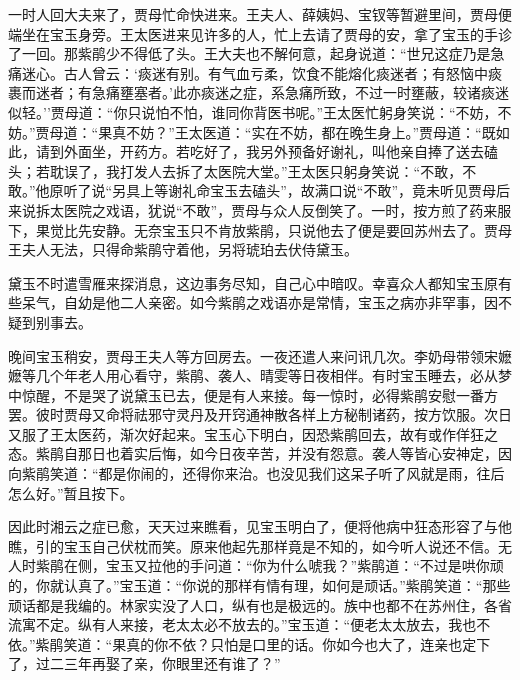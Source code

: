一时人回大夫来了，贾母忙命快进来。王夫人、薛姨妈、宝钗等暂避里间，贾母便端坐在宝玉身旁。王太医进来见许多的人，忙上去请了贾母的安，拿了宝玉的手诊了一回。那紫鹃少不得低了头。王大夫也不解何意，起身说道：``世兄这症乃是急痛迷心。古人曾云：`痰迷有别。有气血亏柔，饮食不能熔化痰迷者；有怒恼中痰裹而迷者；有急痛壅塞者。'此亦痰迷之症，系急痛所致，不过一时壅蔽，较诸痰迷似轻。''贾母道：``你只说怕不怕，谁同你背医书呢。''王太医忙躬身笑说：``不妨，不妨。''贾母道：``果真不妨？''王太医道：``实在不妨，都在晚生身上。''贾母道：``既如此，请到外面坐，开药方。若吃好了，我另外预备好谢礼，叫他亲自捧了送去磕头；若耽误了，我打发人去拆了太医院大堂。''王太医只躬身笑说：``不敢，不敢。''他原听了说``另具上等谢礼命宝玉去磕头''，故满口说``不敢''，竟未听见贾母后来说拆太医院之戏语，犹说``不敢''，贾母与众人反倒笑了。一时，按方煎了药来服下，果觉比先安静。无奈宝玉只不肯放紫鹃，只说他去了便是要回苏州去了。贾母王夫人无法，只得命紫鹃守着他，另将琥珀去伏侍黛玉。

黛玉不时遣雪雁来探消息，这边事务尽知，自己心中暗叹。幸喜众人都知宝玉原有些呆气，自幼是他二人亲密。如今紫鹃之戏语亦是常情，宝玉之病亦非罕事，因不疑到别事去。

晚间宝玉稍安，贾母王夫人等方回房去。一夜还遣人来问讯几次。李奶母带领宋嬷嬷等几个年老人用心看守，紫鹃、袭人、晴雯等日夜相伴。有时宝玉睡去，必从梦中惊醒，不是哭了说黛玉已去，便是有人来接。每一惊时，必得紫鹃安慰一番方罢。彼时贾母又命将祛邪守灵丹及开窍通神散各样上方秘制诸药，按方饮服。次日又服了王太医药，渐次好起来。宝玉心下明白，因恐紫鹃回去，故有或作佯狂之态。紫鹃自那日也着实后悔，如今日夜辛苦，并没有怨意。袭人等皆心安神定，因向紫鹃笑道：``都是你闹的，还得你来治。也没见我们这呆子听了风就是雨，往后怎么好。''暂且按下。

因此时湘云之症已愈，天天过来瞧看，见宝玉明白了，便将他病中狂态形容了与他瞧，引的宝玉自己伏枕而笑。原来他起先那样竟是不知的，如今听人说还不信。无人时紫鹃在侧，宝玉又拉他的手问道：``你为什么唬我？''紫鹃道：``不过是哄你顽的，你就认真了。''宝玉道：``你说的那样有情有理，如何是顽话。''紫鹃笑道：``那些顽话都是我编的。林家实没了人口，纵有也是极远的。族中也都不在苏州住，各省流寓不定。纵有人来接，老太太必不放去的。''宝玉道：``便老太太放去，我也不依。''紫鹃笑道：``果真的你不依？只怕是口里的话。你如今也大了，连亲也定下了，过二三年再娶了亲，你眼里还有谁了？''

